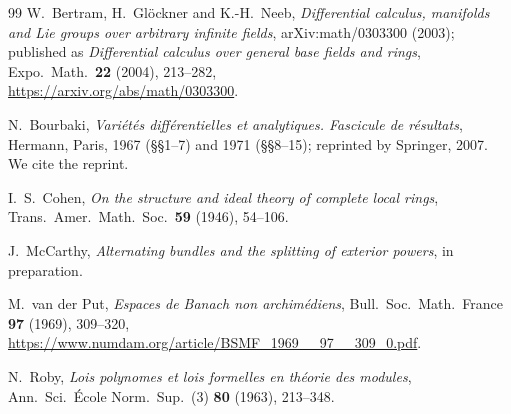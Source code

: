 \documentclass[11pt]{amsart}
\theoremstyle{definition}
\theoremstyle{remark}
\numberwithin{equation}{section}
\theoremstyle{plain}
\theoremstyle{definition}
\theoremstyle{plain}
\begin{document}
\begin{thebibliography}{99}
 W.~Bertram, H.~Gl\"ockner and K.-H.~Neeb,
\emph{Differential calculus, manifolds and Lie groups over arbitrary infinite fields},
arXiv:math/0303300 (2003); published as \emph{Differential calculus over general base fields and rings}, Expo.\ Math.\ \textbf{22} (2004), 213--282,\\
{\small\url{https://arxiv.org/abs/math/0303300}}.

 N.~Bourbaki, \emph{Vari\'et\'es diff\'erentielles et analytiques. Fascicule de r\'esultats}, Hermann, Paris,
1967 (\S\S1--7) and 1971 (\S\S8--15); reprinted by Springer, 2007. We cite the reprint.

 I.~S.~Cohen, \emph{On the structure and ideal theory of complete local rings}, Trans.\ Amer.\ Math.\ Soc.\
\textbf{59} (1946), 54--106.

 J.~McCarthy, \emph{Alternating bundles and the splitting of exterior powers}, in preparation.

 M.~van der Put, \emph{Espaces de Banach non archim\'ediens}, Bull.\ Soc.\ Math.\ France
\textbf{97} (1969), 309--320,\\
{\small\url{https://www.numdam.org/article/BSMF_1969__97__309_0.pdf}}.

 N.~Roby, \emph{Lois polynomes et lois formelles en th\'eorie des modules}, Ann.\ Sci.\ \'Ecole Norm.\
Sup.\ (3) \textbf{80} (1963), 213--348.

\end{thebibliography}
\end{document}
